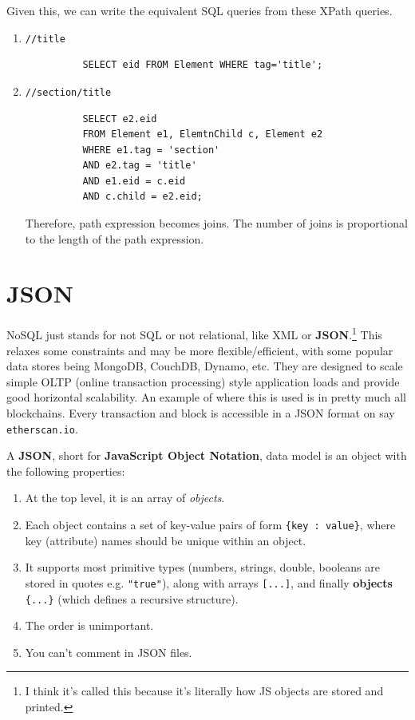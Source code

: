 \documentclass{article}
\begin{document}
    Given this, we can write the equivalent SQL queries from these XPath queries. 
    \begin{enumerate}
      \item \texttt{//title} 
        \begin{lstlisting}
          SELECT eid FROM Element WHERE tag='title';
        \end{lstlisting}

      \item \texttt{//section/title} 
        \begin{lstlisting}
          SELECT e2.eid 
          FROM Element e1, ElemtnChild c, Element e2 
          WHERE e1.tag = 'section' 
          AND e2.tag = 'title' 
          AND e1.eid = c.eid 
          AND c.child = e2.eid;
        \end{lstlisting}
        Therefore, path expression becomes joins. The number of joins is proportional to the length of the path expression. 
    \end{enumerate}

\section{JSON}

  NoSQL just stands for not SQL or not relational, like XML or \textbf{JSON}.\footnote{I think it's called this because it's literally how JS objects are stored and printed.} This relaxes some constraints and may be more flexible/efficient, with some popular data stores being MongoDB, CouchDB, Dynamo, etc. They are designed to scale simple OLTP (online transaction processing) style application loads and provide good horizontal scalability. An example of where this is used is in pretty much all blockchains. Every transaction and block is accessible in a JSON format on say \texttt{etherscan.io}. 

  \begin{definition}[JSON]
    A \textbf{JSON}, short for \textbf{JavaScript Object Notation}, data model is an object with the following properties: 
    \begin{enumerate} 
      \item At the top level, it is an array of \textit{objects}. 
      \item Each object contains a set of key-value pairs of form \texttt{\{key : value\}}, where key (attribute) names should be unique within an object. 
      \item It supports most primitive types (numbers, strings, double, booleans are stored in quotes e.g. \texttt{"true"}), along with arrays \texttt{[...]}, and finally \textbf{objects} \texttt{\{...\}} (which defines a recursive structure). 
      \item The order is unimportant. 
      \item You can't comment in JSON files. 
    \end{enumerate}
  \end{definition}
\end{document}

